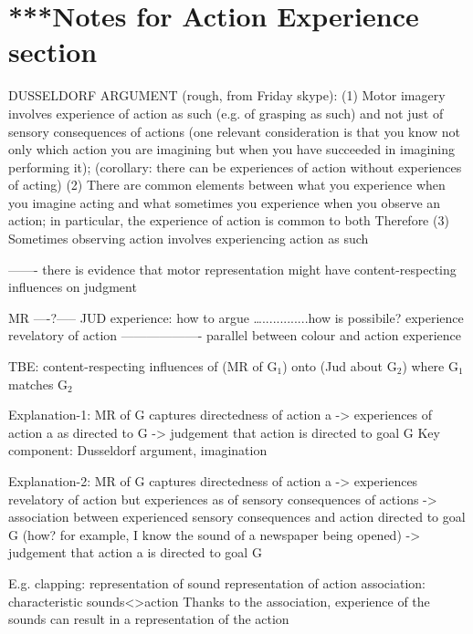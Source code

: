 \documentclass[12pt,\papersize]{extarticle}
\begin{document}
\section{***Notes for Action Experience section}


DUSSELDORF ARGUMENT (rough, from Friday skype):
(1) Motor imagery involves experience of action as such (e.g. of grasping as such) and not just of sensory consequences of actions
(one relevant consideration is that you know not only which action you are imagining but when you have succeeded in imagining performing it);
(corollary: there can be experiences of action without experiences of acting)
(2) There are common elements between what you  experience when you imagine acting and what sometimes you experience when you observe an action; in particular, the experience of action is common to both
Therefore
(3) Sometimes observing action involves experiencing action as such



------- there is evidence that motor representation might have content-respecting influences on judgment

MR ----?----- JUD
  experience: how to argue 
….............how is possibile? experience revelatory of action
------------------- parallel between colour and action experience

TBE: content-respecting influences of (MR of G$_1$) onto (Jud about G$_2$) where G$_1$ matches G$_2$


Explanation-1: MR of G captures directedness of action a -> experiences of action a as directed to G -> judgement that action is directed to goal G
	Key component: Dusseldorf argument, imagination

Explanation-2: MR of G captures directedness of action a -> experiences revelatory of action but experiences as of sensory consequences of actions -> association between experienced sensory consequences and action directed to goal G (how? for example, I know the sound of a newspaper being opened) -> judgement that action a is directed to goal G

E.g. clapping:
	representation of sound
	representation of action
	association: characteristic sounds<>action
	Thanks to the association, experience of the sounds can result in a representation of the action
\end{document}
